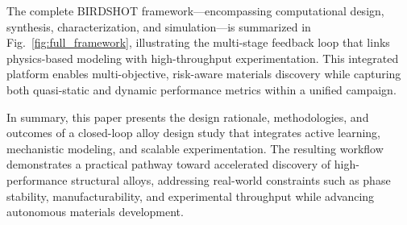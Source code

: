 The complete BIRDSHOT framework—encompassing computational design, synthesis, characterization, and simulation—is summarized in Fig.~\ref{fig:full_framework}, illustrating the multi-stage feedback loop that links physics-based modeling with high-throughput experimentation. This integrated platform enables multi-objective, risk-aware materials discovery while capturing both quasi-static and dynamic performance metrics within a unified campaign.

In summary, this paper presents the design rationale, methodologies, and outcomes of a closed-loop alloy design study that integrates active learning, mechanistic modeling, and scalable experimentation. The resulting workflow demonstrates a practical pathway toward accelerated discovery of high-performance structural alloys, addressing real-world constraints such as phase stability, manufacturability, and experimental throughput while advancing autonomous materials development.






